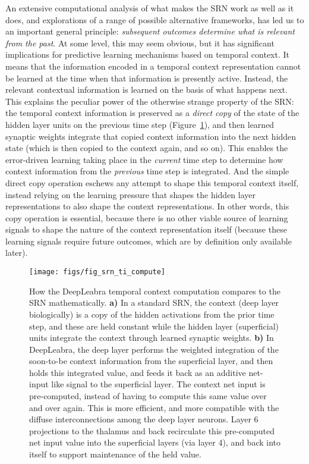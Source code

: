 \documentclass[12pt,twoside]{article}
\newif\myifpdf
\begin{document}
An extensive computational analysis of what makes the SRN work as well as it does, and explorations of a range of possible alternative frameworks, has led us to an important general principle: {\em subsequent outcomes determine what is relevant from the past}.  At some level, this may seem obvious, but it has significant implications for predictive learning mechanisms based on temporal context.  It means that the information encoded in a temporal context representation cannot be learned at the time when that information is presently active.  Instead, the relevant contextual information is learned on the basis of what happens next.  This explains the peculiar power of the otherwise strange property of the SRN: the temporal context information is preserved as a {\em direct copy} of the state of the hidden layer units on the previous time step (Figure~\ref{fig.srn_vs_ti}), and then learned synaptic weights integrate that copied context information into the next hidden state (which is then copied to the context again, and so on).  This enables the error-driven learning taking place in the {\em current} time step to determine how context information from the {\em previous} time step is integrated.  And the simple direct copy operation eschews any attempt to shape this temporal context itself, instead relying on the learning pressure that shapes the hidden layer representations to also shape the context representations.  In other words, this copy operation is essential, because there is no other viable source of learning signals to shape the nature of the context representation itself (because these learning signals require future outcomes, which are by definition only available later).

\begin{figure}
  \centering\texttt{[image: figs/fig\_srn\_ti\_compute]}
  \caption{ How the DeepLeabra temporal context computation compares to the SRN mathematically. {\bf a)} In a standard SRN, the context (deep layer biologically) is a copy of the hidden activations from the prior time step, and these are held constant while the hidden layer (superficial) units integrate the context through learned synaptic weights.  {\bf b)} In DeepLeabra, the deep layer performs the weighted integration of the soon-to-be context information from the superficial layer, and then holds this integrated value, and feeds it back as an additive net-input like signal to the superficial layer.  The context net input is pre-computed, instead of having to compute this same value over and over again.  This is more efficient, and more compatible with the diffuse interconnections among the deep layer neurons.  Layer 6 projections to the thalamus and back recirculate this pre-computed net input value into the superficial layers (via layer 4), and back into itself to support maintenance of the held value.}
  \label{fig.srn_vs_ti}
\end{figure}
\end{document}
